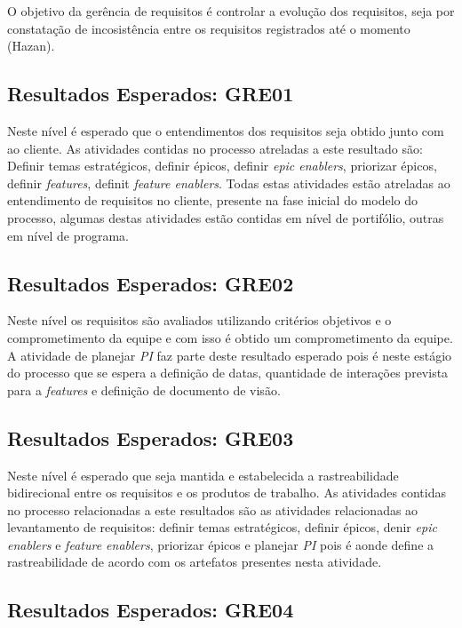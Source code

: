 	O objetivo da gerência de requisitos é controlar a evolução dos requisitos, seja por constatação de incosistência entre os requisitos registrados até o momento (Hazan).

	\subsection{Resultados Esperados: GRE01}

	Neste nível é esperado que o entendimentos dos requisitos seja obtido junto com ao cliente. As atividades contidas no processo atreladas a este resultado são: Definir temas estratégicos, definir épicos, definir {\itshape epic enablers}, priorizar épicos, definir {\itshape features}, definit {\itshape feature enablers}. Todas estas atividades estão atreladas ao entendimento de requisitos no cliente, presente na fase inicial do modelo do processo, algumas destas atividades estão contidas em nível de portifólio, outras em nível de programa.

	\subsection{Resultados Esperados: GRE02}

	Neste nível os requisitos são avaliados utilizando critérios objetivos e o comprometimento da equipe e com isso é obtido um comprometimento da equipe. A atividade de planejar {\itshape PI} faz parte deste resultado esperado pois é neste estágio do processo que se espera a definição de datas, quantidade de interações prevista para a {\itshape features} e definição de documento de visão.


	\subsection{Resultados Esperados: GRE03}

	Neste nível é esperado que seja mantida e estabelecida a rastreabilidade bidirecional entre os requisitos e os produtos de trabalho. As atividades contidas no processo relacionadas a este resultados são as atividades relacionadas ao levantamento de requisitos: definir temas estratégicos, definir épicos, denir {\itshape epic enablers} e {\itshape feature enablers}, priorizar épicos e planejar {\itshape PI} pois é aonde define a rastreabilidade de acordo com os artefatos presentes nesta atividade.

	\subsection{Resultados Esperados: GRE04}
	
